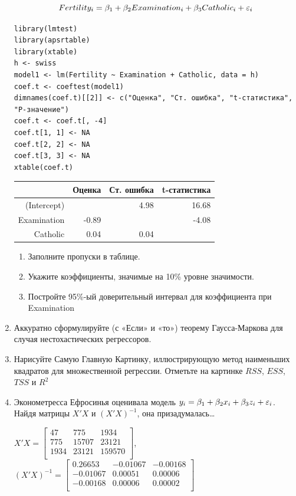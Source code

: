 \documentclass[12pt, a4paper]{article}
\begin{document}
\begin{enumerate}
\[Fertility_i=\beta_1+\beta_2 Examination_i+\beta_3 Catholic_i+\varepsilon_i\]

\begin{verbatim}
library(lmtest)
library(apsrtable)
library(xtable)
h <- swiss
model1 <- lm(Fertility ~ Examination + Catholic, data = h)
coef.t <- coeftest(model1)
dimnames(coef.t)[[2]] <- c("Оценка", "Ст. ошибка", "t-статистика", "P-значение")
coef.t <- coef.t[, -4]
coef.t[1, 1] <- NA
coef.t[2, 2] <- NA
coef.t[3, 3] <- NA
xtable(coef.t)
\end{verbatim}

\begin{tabular}{rrrr}
  \hline
 & Оценка & Ст. ошибка & t-статистика \\
  \hline
(Intercept) &  & 4.98 & 16.68 \\
  Examination & -0.89 &  & -4.08 \\
  Catholic & 0.04 & 0.04 &  \\
   \hline
\end{tabular}



\begin{enumerate}
\item Заполните пропуски в таблице.
\item Укажите коэффициенты, значимые на 10\% уровне значимости.
\item Постройте 95\%-ый доверительный интервал для коэффициента при Examination
\end{enumerate}

\item Аккуратно сформулируйте (с «Если» и «то») теорему Гаусса-Маркова для случая нестохастических регрессоров.

\item Нарисуйте Самую Главную Картинку, иллюстрирующую метод наименьших квадратов для множественной регрессии. Отметьте на картинке $RSS$, $ESS$, $TSS$ и $R^2$

\item Эконометресса Ефросинья оценивала модель $y_i=\beta_1 + \beta_2 x_i + \beta_3 z_i + \varepsilon_i$. Найдя матрицы $X'X$ и $(X'X)^{-1}$, она призадумалась\ldots

$X'X = \begin{bmatrix}{}
  47 & 775 & 1934 \\
  775 & 15707 & 23121 \\
  1934 & 23121 & 159570 \\
  \end{bmatrix}$,
$(X'X)^{-1}=\begin{bmatrix}{}
  0.26653 & -0.01067 & -0.00168 \\
  -0.01067 & 0.00051 & 0.00006 \\
  -0.00168 & 0.00006 & 0.00002 \\
  \end{bmatrix}$



\end{enumerate}
\end{document}
